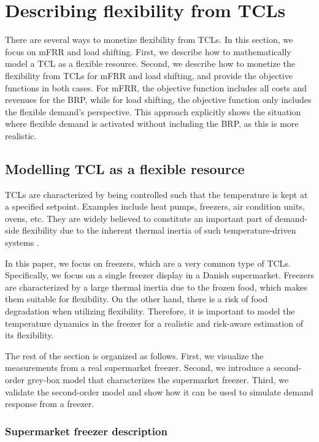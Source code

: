 \section{Describing flexibility from TCLs}\label{sec:monetizing_flex}

There are several ways to monetize flexibility from TCLs. In this section, we focus on mFRR and load shifting. First, we describe how to mathematically model a TCL as a flexible resource. Second, we describe how to monetize the flexibility from TCLs for mFRR and load shifting, and provide the objective functions in both cases. For mFRR, the objective function includes all costs and revenues for the BRP, while for load shifting, the objective function only includes the flexible demand's perspective. This approach explicitly shows the situation where flexible demand is activated without including the BRP, as this is more realistic.

\subsection{Modelling TCL as a flexible resource}

TCLs are characterized by being controlled such that the temperature is kept at a specified setpoint. Examples include heat pumps, freezers, air condition units, ovens, etc. They are widely believed to constitute an important part of demand-side flexibility due to the inherent thermal inertia of such temperature-driven systems \cite{hao2014aggregate}.

In this paper, we focus on freezers, which are a very common type of TCLs. Specifically, we focus on a single freezer display in a Danish supermarket. Freezers are characterized by a large thermal inertia due to the frozen food, which makes them suitable for flexibility. On the other hand, there is a risk of food degradation when utilizing flexibility. Therefore, it is important to model the temperature dynamics in the freezer for a realistic and risk-aware estimation of its flexibility.

The rest of the section is organized as follows. First, we visualize the measurements from a real supermarket freezer. Second, we introduce a second-order grey-box model that characterizes the supermarket freezer. Third, we validate the second-order model and show how it can be used to simulate demand response from a freezer.

\subsubsection{Supermarket freezer description}

